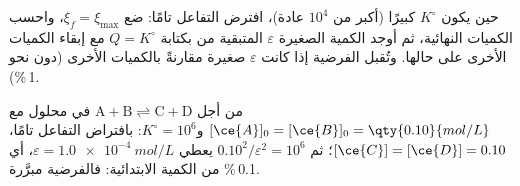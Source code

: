 \begin{method}\label{met:b1:extent-q-and-k:quantitative}
حين يكون $K^\circ$ كبيرًا (أكبر من $10^4$ عادة)، افترض التفاعل
تامًا: ضع $\xi_f = \xi_{\max}$، واحسب الكميات النهائية، ثم أوجد
الكمية الصغيرة $\varepsilon$ المتبقية من  بكتابة $Q =
K^\circ$ مع إبقاء الكميات الأخرى على حالها. وتُقبل الفرضية إذا كانت
$\varepsilon$ صغيرة مقارنةً بالكميات الأخرى (دون نحو
1\,\%).
\end{method}

\begin{example}[تفاعل كمّي]\label{ex:b1:extent-q-and-k:quant}
من أجل $\mathrm{A + B \rightleftharpoons C + D}$ في محلول مع $[\ce{A}]_0 = [\ce{B}]_0 =
\qty{0.10}{mol/L}$ و$K^\circ = 10^6$: بافتراض التفاعل تامًا، $[\ce{C}]
= [\ce{D}] = 0.10$؛ ثم $0.10^2/\varepsilon^2 = 10^6$ يعطي $\varepsilon
= \qty{1.0e-4}{mol/L}$، أي 0.1\,\% من الكمية الابتدائية: فالفرضية
مبرَّرة.
\end{example}

